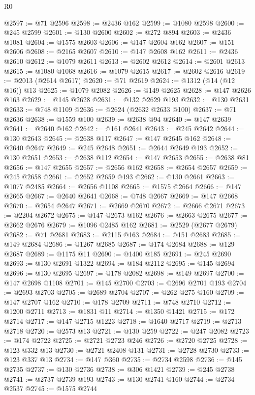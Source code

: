 \begin{lexlean}{R0}
\begin{coremodule}
@2597 := @71 @2596
@2598 := @2436 @162
@2599 := @1080 @2598
@2600 := @245 @2599
@2601 := @130 @2600
@2602 := @272 @894
@2603 := @2436 @1081
@2604 := @1575 @2603
@2606 := @147 @2604 @162
@2607 := @151 @2606
@2608 := @2165 @2607
@2610 := @147 @2608 @162
@2611 := @2436 @2610
@2612 := @1079 @2611
@2613 := @2602 @2612
@2614 := @2601 @2613
@2615 := @1080 @1068
@2616 := @1079 @2615
@2617 := @2602 @2616
@2619 := @2013 (@2614 @2617)
@2620 := @71 @2619
@2624 := @1312 (@14 (@12 @16)) @13
@2625 := @1079 @2082
@2626 := @149 @2625
@2628 := @147 @2626 @163
@2629 := @145 @2628
@2631 := @132 @2629 @193
@2632 := @130 @2631
@2633 := @748 @1109
@2636 := @2624 (@2632 @2633 @100)
@2637 := @71 @2636
@2638 := @1559 @100
@2639 := @2638 @94
@2640 := @147 @2639
@2641 := @2640 @162
@2642 := @161 @2641
@2643 := @245 @2642
@2644 := @130 @2643
@2645 := @2638 @117
@2647 := @147 @2645 @162
@2648 := @2640 @2647
@2649 := @245 @2648
@2651 := @2644 @2649 @193
@2652 := @130 @2651
@2653 := @2638 @112
@2654 := @147 @2653
@2655 := @2638 @81
@2656 := @147 @2655
@2657 := @2656 @162
@2658 := @2654 @2657
@2659 := @245 @2658
@2661 := @2652 @2659 @193
@2662 := @130 @2661
@2663 := @1077 @2485
@2664 := @2656 @1108
@2665 := @1575 @2664
@2666 := @147 @2665
@2667 := @2640 @2641
@2668 := @748 @2667
@2669 := @147 @2668
@2670 := @2654 @2647
@2671 := @2669 @2670
@2672 := @2666 @2671
@2673 := @2204 @2672
@2675 := @147 @2673 @162
@2676 := @2663 @2675
@2677 := @2662 @2676
@2679 := @1096 @2485 @162
@2681 := @2529 (@2677 @2679)
@2682 := @71 @2681
@2683 := @2115 @163
@2684 := @151 @2683
@2685 := @149 @2684
@2686 := @1267 @2685
@2687 := @174 @2684
@2688 := @129 @2687
@2689 := @1175 @11
@2690 := @1400 @185
@2691 := @245 @2690
@2693 := @130 @2691 @1322
@2694 := @184 @2112
@2695 := @145 @2694
@2696 := @130 @2695
@2697 := @178 @2082
@2698 := @149 @2697
@2700 := @147 @2698 @1108
@2701 := @145 @2700
@2703 := @2696 @2701 @193
@2704 := @2693 @2703
@2705 := @2689 @2704
@2707 := @262 @275 @160
@2709 := @147 @2707 @162
@2710 := @178 @2709
@2711 := @748 @2710
@2712 := @1200 @2711
@2713 := @1831 @11
@2714 := @1350 @1421
@2715 := @172 @2714
@2717 := @147 @2715 @1223
@2718 := @1640 @2717
@2719 := @2713 @2718
@2720 := @2573 @13
@2721 := @130 @259
@2722 := @247 @2082
@2723 := @174 @2722
@2725 := @2721 @2723 @246
@2726 := @2720 @2725
@2728 := @123 @332 @13
@2730 := @2721 @2408 @131
@2731 := @2728 @2730
@2733 := @123 @337 @13
@2734 := @147 @360
@2735 := @2734 @2598
@2736 := @145 @2735
@2737 := @130 @2736
@2738 := @306 @1421
@2739 := @245 @2738
@2741 := @2737 @2739 @193
@2743 := @130 @2741 @160
@2744 := @2734 @2537
@2745 := @1575 @2744

\end{coremodule}
\end{lexlean}
